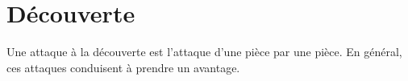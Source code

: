 
\section{Découverte}

Une attaque à la découverte est l'attaque d'une pièce par une pièce. En général, ces attaques conduisent à prendre un avantage.

